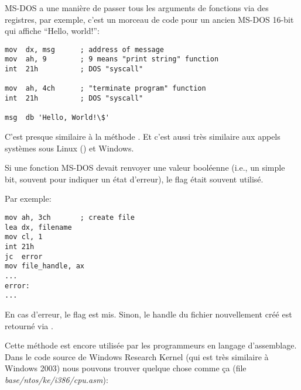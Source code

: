 
MS-DOS a une manière de passer tous les arguments de fonctions via des registres,
par exemple, c'est un morceau de code pour un ancien MS-DOS 16-bit qui affiche
``Hello, world!'':

\begin{lstlisting}[style=customasmx86]
mov  dx, msg      ; address of message
mov  ah, 9        ; 9 means "print string" function
int  21h          ; DOS "syscall"

mov  ah, 4ch      ; "terminate program" function
int  21h          ; DOS "syscall"

msg  db 'Hello, World!\$'
\end{lstlisting}

C'est presque similaire à la méthode .
Et c'est aussi très similaire aux appels systèmes sous Linux () et Windows.

Si une fonction MS-DOS devait renvoyer une valeur booléenne (i.e., un simple bit,
souvent pour indiquer un état d'erreur), le flag  était souvent utilisé.

Par exemple:

\begin{lstlisting}[style=customasmx86]
mov ah, 3ch       ; create file
lea dx, filename
mov cl, 1
int 21h
jc  error
mov file_handle, ax
...
error:
...
\end{lstlisting}

En cas d'erreur, le flag  est mis. Sinon, le handle du fichier nouvellement
créé est retourné via .

Cette méthode est encore utilisée par les programmeurs en langage d'assemblage.
Dans le code source de Windows Research Kernel (qui est très similaire à Windows
2003) nous pouvons trouver quelque chose comme ça (file \emph{base/ntos/ke/i386/cpu.asm}):


